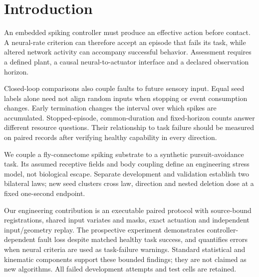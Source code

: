 \section{Introduction}
An embedded spiking controller must produce an effective action before contact. A neural-rate criterion can therefore accept an episode that fails its task, while altered network activity can accompany successful behavior. Assessment requires a defined plant, a causal neural-to-actuator interface and a declared observation horizon.

Closed-loop comparisons also couple faults to future sensory input. Equal seed labels alone need not align random inputs when stopping or event consumption changes. Early termination changes the interval over which spikes are accumulated. Stopped-episode, common-duration and fixed-horizon counts answer different resource questions. Their relationship to task failure should be measured on paired records after verifying healthy capability in every direction.

We couple a fly-connectome spiking substrate to a synthetic pursuit-avoidance task. Its assumed receptive fields and body coupling define an engineering stress model, not biological escape. Separate development and validation establish two bilateral laws; new seed clusters cross law, direction and nested deletion dose at a fixed one-second endpoint.

Our engineering contribution is an executable paired protocol with source-bound registrations, shared input variates and masks, exact actuation and independent input/geometry replay. The prospective experiment demonstrates controller-dependent fault loss despite matched healthy task success, and quantifies errors when neural criteria are used as task-failure warnings. Standard statistical and kinematic components support these bounded findings; they are not claimed as new algorithms. All failed development attempts and test cells are retained.
